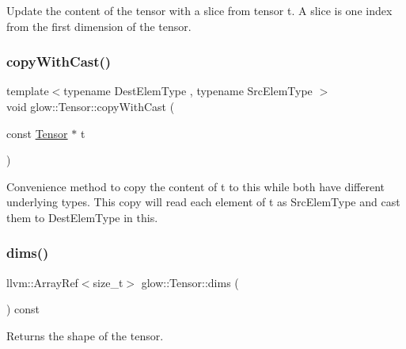 Update the content of the tensor with a slice from tensor {\ttfamily t}. A slice is one index from the first dimension of the tensor. \mbox{\label{classglow_1_1_tensor_ae944ce87f0c192971b423b5fe93baaa9}} 
\subsubsection{\texorpdfstring{copy\+With\+Cast()}{copyWithCast()}}
{\footnotesize\ttfamily template$<$typename Dest\+Elem\+Type , typename Src\+Elem\+Type $>$ \\
void glow\+::\+Tensor\+::copy\+With\+Cast (\begin{DoxyParamCaption}\item[{const \hyperlink{classglow_1_1_tensor}{Tensor} $\ast$}]{t }\end{DoxyParamCaption})\hspace{0.3cm}{\ttfamily [inline]}}

Convenience method to copy the content of {\ttfamily t} to this while both have different underlying types. This copy will read each element of {\ttfamily t} as Src\+Elem\+Type and cast them to Dest\+Elem\+Type in this. \mbox{\label{classglow_1_1_tensor_ad299b107d8ed92bb55392c4cb97070d9}} 
\subsubsection{\texorpdfstring{dims()}{dims()}}
{\footnotesize\ttfamily llvm\+::\+Array\+Ref$<$size\+\_\+t$>$ glow\+::\+Tensor\+::dims (\begin{DoxyParamCaption}{ }\end{DoxyParamCaption}) const\hspace{0.3cm}{\ttfamily [inline]}}

\begin{DoxyReturn}{Returns}
the shape of the tensor. 
\end{DoxyReturn}
\mbox{\label{classglow_1_1_tensor_ac67a66dc3db1ac2e30c341552e93e20d}} 
